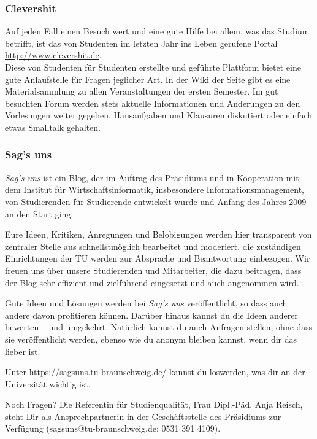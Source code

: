 \begin{multicols}{2}
	\subsubsection*{Clevershit}
		Auf jeden Fall einen Besuch wert und eine gute Hilfe bei allem, was das Studium betrifft, ist das von Studenten im letzten Jahr ins Leben gerufene Portal \mbox{\url{http://www.clevershit.de}}.\\
		Diese von Studenten für Studenten erstellte und geführte Plattform bietet eine gute Anlaufstelle für Fragen jeglicher Art. In der Wiki der Seite gibt es eine Materialsammlung zu allen Veranstaltungen der ersten Semester. Im gut besuchten Forum werden stets aktuelle Informationen und Änderungen zu den Vorlesungen weiter gegeben, Hausaufgaben und Klausuren diskutiert oder einfach etwas Smalltalk gehalten.

	\subsubsection*{Sag's uns}
		\emph{Sag's uns} ist ein Blog, der im Auftrag des Präsidiums und in Kooperation mit dem Institut für Wirtschaftsinformatik, insbesondere Informationsmanagement, von Studierenden für Studierende entwickelt wurde und Anfang des Jahres 2009 an den Start ging.

		Eure Ideen, Kritiken, Anregungen und Belobigungen werden hier transparent von zentraler Stelle aus schnellstmöglich bearbeitet und moderiert, die zuständigen Einrichtungen der TU werden zur Absprache und Beantwortung einbezogen. Wir freuen uns über unsere Studierenden und Mitarbeiter, die dazu beitragen, dass der Blog sehr effizient und zielführend eingesetzt und auch angenommen wird.

		Gute Ideen und Lösungen werden bei \emph{Sag's uns} veröffentlicht, so dass auch andere davon profitieren können. Darüber hinaus kannst du die Ideen anderer bewerten – und umgekehrt. Natürlich kannst du auch Anfragen stellen, ohne dass sie veröffentlicht werden, ebenso wie du anonym bleiben kannst, wenn dir das lieber ist. 

		Unter \url{https://sagsuns.tu-braunschweig.de/} kannst du loswerden, was dir an der Universität wichtig ist.

		Noch Fragen? Die Referentin für Studienqualität, Frau Dipl.-Päd. Anja Reisch, steht Dir als Ansprechpartnerin in der Geschäftsstelle des Präsidiums zur Verfügung (sagsuns@tu-braunschweig.de; 0531 391 4109).


\end{multicols}
